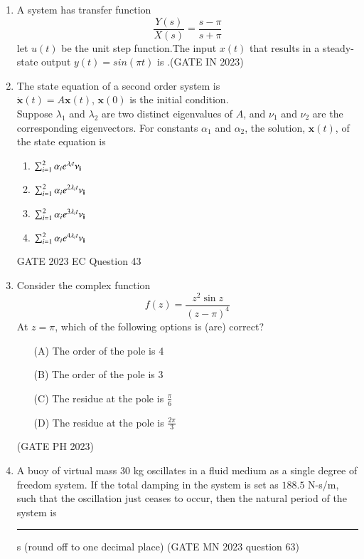\begin{enumerate}[label=\thechapter.\arabic*,ref=\thechapter.\theenumi]
\item A system has transfer function
 \[\frac{Y(s)}{X(s)}=\frac {s-\pi}{s+\pi}\]
 let $u(t)$ be the unit step function.The input $x(t)$ that results in a steady-state output $y(t)=sin(\pi t)$ is \underline{\quad}.\hfill (GATE IN 2023)\\
 \solution
 \newpage
 \item The state equation of a second order system is \\
$ \dot{\bm{x}}(t) = A\bm{x}(t)$, \quad $\bm{x}(0)$ is the initial condition. \\
Suppose $\lambda_1$ and $\lambda_2$ are two distinct eigenvalues of $A$, and $\nu_1$ and $\nu_2$ are the corresponding eigenvectors. For constants $\alpha_1$ and $\alpha_2$, the solution, $\bm{x}(t)$, of the state equation is \\
\begin{enumerate}[label=(\Alph*)]
\item $\sum_{i=1}^{2} \alpha_ie^{\lambda_it}\bf{\nu}_i$
\item $\sum_{i=1}^{2} \alpha_ie^{2\lambda_it}\bf{\nu}_i$
\item $\sum_{i=1}^{2} \alpha_ie^{3\lambda_it}\bf{\nu}_i$
\item $\sum_{i=1}^{2} \alpha_ie^{4\lambda_it}\bf{\nu}_i$
\end{enumerate}
\hfill{GATE 2023 EC Question 43} \\
\newpage
\item Consider the complex function
\[ f(z) = \frac{z^{2}\sin z}{(z-\pi)^4} \]
At \( z = \pi \), which of the following options is (are) correct?
\begin{enumerate}[label=\textbf{\arabic*.}, font=\bfseries, align=left]
    \item[(A)] The order of the pole is 4 
    \item[(B)] The order of the pole is 3 
    \item[(C)] The residue at the pole is \( \frac{\pi}{6} \)
    \item[(D)] The residue at the pole is \( \frac{2\pi}{3} \)
\end{enumerate}
\hfill (GATE PH 2023)
\newpage
 \item
 A buoy of virtual mass $30$ kg oscillates in a fluid medium as a single degree of
freedom system. If the total damping in the system is set as $188.5$ N-s/m, such
that the oscillation just ceases to occur, then the natural period of the system is
\rule{1cm}{0.15mm} s (round off to one decimal place)
\hfill(GATE MN 2023 question 63)\\

\end{enumerate}
